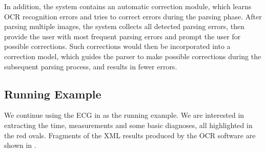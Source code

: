 In addition, the system contains an automatic correction module,
which learns OCR recognition errors and tries to correct errors
during the parsing phase.
After parsing multiple images, the system collects all detected parsing errors,
then provide the user with most frequent parsing errors and
prompt the user for possible corrections.
Such corrections would then be incorporated into a correction model,
which guides the parser to make possible corrections
during the subsequent parsing process, and results in fewer errors.



\subsection{Running Example}
We continue using the ECG in  as the running example.
We are interested in extracting the time, measurements and some basic diagnoses,
all highlighted in the red ovals.
Fragments of the XML results produced by the OCR software are shown in .

